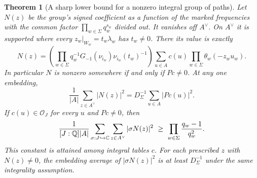 \documentclass[a4paper,11pt]{article}
\newtheorem{theorem}[proposition]{Theorem}
\theoremstyle{definition}
\theoremstyle{remark}
\numberwithin{equation}{section}
\begin{document}
\begin{theorem}[A sharp lower bound for a nonzero integral group of paths]
\label{thm:markedtableintegral387}
Let \(N(z)\) be the group's signed coefficient as a function
of the marked frequencies with the common factor
\(\prod_{w\in\Sigma}q_w^{s_w}\) divided out. It vanishes off
\(A^\vee\). On \(A^\vee\) it is supported where every
\(z_w|_{W_w}=t_w\lambda_w\) has \(t_w\ne0\). There its
value is exactly
\[
    N(z)=
       \left(\prod_{w\in\Sigma}q_w^{-1}
                       G_{-1}(\nu_{i_w})\nu_{i_w}(t_w)^{-1}\right)
       \sum_{u\in A}c(u)\prod_{w\in\Sigma}\theta_w(-z_wu_w).
\]
In particular \(N\) is nonzero somewhere if and only if \(Pc\ne0\).
At any one embedding,
\[
       \frac1{|A|}\sum_{z\in A^\vee}|N(z)|^2
                   =D_\Sigma^{-1}\sum_{u\in A}|Pc(u)|^2.
\]
If \(c(u)\in\mathcal O_J\) for every \(u\) and \(Pc\ne0\), then
\[
 \frac{1}{[J:\mathbb Q]|A|}\sum_{\sigma:J\hookrightarrow\mathbb C}
                 \sum_{z\in A^\vee}|\sigma N(z)|^2
   \ \ge\ \prod_{w\in\Sigma}\frac{q_w-1}{q_w^2}.
\]
This constant is attained among integral tables \(c\).
For each prescribed \(z\) with \(N(z)\ne0\), the embedding
average of \(|\sigma N(z)|^2\) is at least \(D_\Sigma^{-1}\)
under the same integrality assumption.
\end{theorem}
\end{document}
